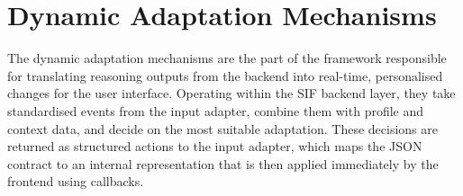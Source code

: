 \documentclass[openany]{book}
\begin{document}
    



\section{Dynamic Adaptation Mechanisms}
The dynamic adaptation mechanisms are the part of the framework responsible for translating reasoning outputs from the backend into real-time, personalised changes for the user interface. Operating within the SIF backend layer, they take standardised events from the input adapter, combine them with profile and context data, and decide on the most suitable adaptation. These decisions are returned as structured actions to the input adapter, which maps the JSON contract to an internal representation that is then applied immediately by the frontend using callbacks.
\end{document}
